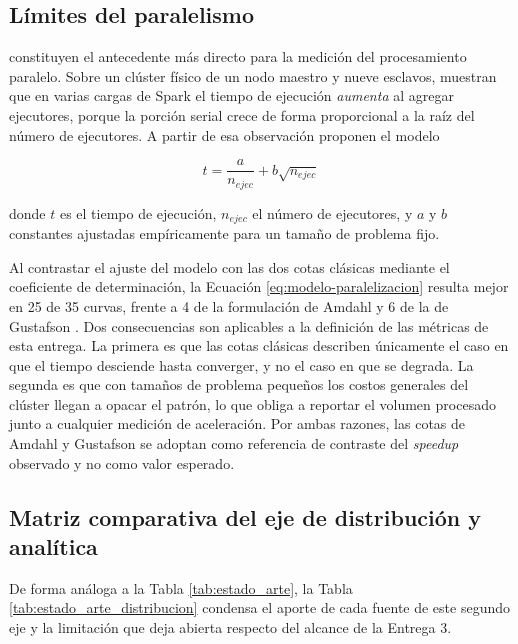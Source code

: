 \documentclass[12pt]{article}
\begin{document}
    \subsection{Límites del paralelismo}

    \textcite{ahmed2021} constituyen el antecedente más directo para la medición del procesamiento paralelo. Sobre un clúster físico de un nodo maestro y nueve esclavos, muestran que en varias cargas de Spark el tiempo de ejecución \emph{aumenta} al agregar ejecutores, porque la porción serial crece de forma proporcional a la raíz del número de ejecutores. A partir de esa observación proponen el modelo

    \begin{equation}
        t = \frac{a}{n_{ejec}} + b\sqrt{n_{ejec}}
        \label{eq:modelo-paralelizacion}
    \end{equation}

    donde $t$ es el tiempo de ejecución, $n_{ejec}$ el número de ejecutores, y $a$ y $b$ constantes ajustadas empíricamente para un tamaño de problema fijo.

    Al contrastar el ajuste del modelo con las dos cotas clásicas mediante el coeficiente de determinación, la Ecuación \eqref{eq:modelo-paralelizacion} resulta mejor en 25 de 35 curvas, frente a 4 de la formulación de Amdahl \cite{amdahl1967} y 6 de la de Gustafson \cite{gustafson1988}. Dos consecuencias son aplicables a la definición de las métricas de esta entrega. La primera es que las cotas clásicas describen únicamente el caso en que el tiempo desciende hasta converger, y no el caso en que se degrada. La segunda es que con tamaños de problema pequeños los costos generales del clúster llegan a opacar el patrón, lo que obliga a reportar el volumen procesado junto a cualquier medición de aceleración. Por ambas razones, las cotas de Amdahl y Gustafson se adoptan como referencia de contraste del \emph{speedup} observado y no como valor esperado.

    \subsection{Matriz comparativa del eje de distribución y analítica}

    De forma análoga a la Tabla \ref{tab:estado_arte}, la Tabla \ref{tab:estado_arte_distribucion} condensa el aporte de cada fuente de este segundo eje y la limitación que deja abierta respecto del alcance de la Entrega 3.
\end{document}
